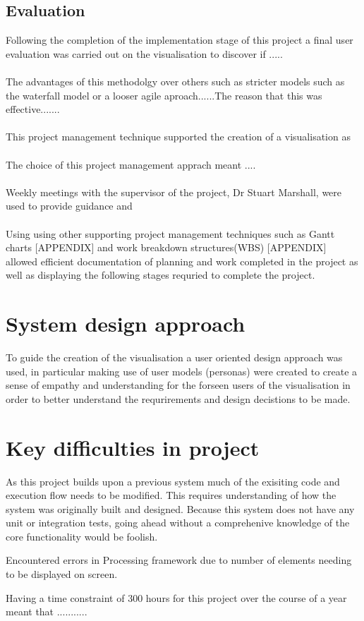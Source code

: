 \subsection{Evaluation}
Following the completion of the implementation stage of this project a final user evaluation was carried out on the visualisation to discover if .....
\\\\
The advantages of this methodolgy over others such as stricter models such as the waterfall model or a looser agile aproach......The reason that this was effective.......
\\\\
This project management technique supported the creation of a visualisation as 
\\\\
The choice of this project management apprach meant ....
\\\\
Weekly meetings with the supervisor of the project, Dr Stuart Marshall, were used to provide guidance and 
\\\\
Using using other supporting project management techniques such as Gantt charts [APPENDIX] and work breakdown structures(WBS) [APPENDIX] allowed efficient documentation of planning and work completed in the project as well as displaying the following stages requried to complete the project.

\section{System design approach}
To guide the creation of the visualisation a user oriented design approach was used, in particular making use of user models (personas) were created to create a sense of empathy and understanding for the forseen users of the visualisation in order to better understand the requrirements and design decistions to be made. 

\section{Key difficulties in project}
As this project builds upon a previous system much of the exisiting code and execution flow needs to be modified. This requires understanding of how the system was originally built and designed. Because this system does not have any unit or integration tests, going ahead without a comprehenive knowledge of the core functionality would be foolish.

Encountered errors in Processing framework due to number of elements needing to be displayed on screen. 

Having a time constraint of 300 hours for this project over the course of a year meant that ...........

